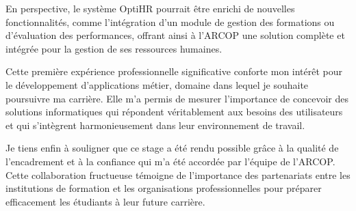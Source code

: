 En perspective, le système OptiHR pourrait être enrichi de nouvelles fonctionnalités, comme l'intégration d'un module de gestion des formations ou d'évaluation des performances, offrant ainsi à l'ARCOP une solution complète et intégrée pour la gestion de ses ressources humaines.

Cette première expérience professionnelle significative conforte mon intérêt pour le développement d'applications métier, domaine dans lequel je souhaite poursuivre ma carrière. Elle m'a permis de mesurer l'importance de concevoir des solutions informatiques qui répondent véritablement aux besoins des utilisateurs et qui s'intègrent harmonieusement dans leur environnement de travail.

Je tiens enfin à souligner que ce stage a été rendu possible grâce à la qualité de l'encadrement et à la confiance qui m'a été accordée par l'équipe de l'ARCOP. Cette collaboration fructueuse témoigne de l'importance des partenariats entre les institutions de formation et les organisations professionnelles pour préparer efficacement les étudiants à leur future carrière.
\clearpage
